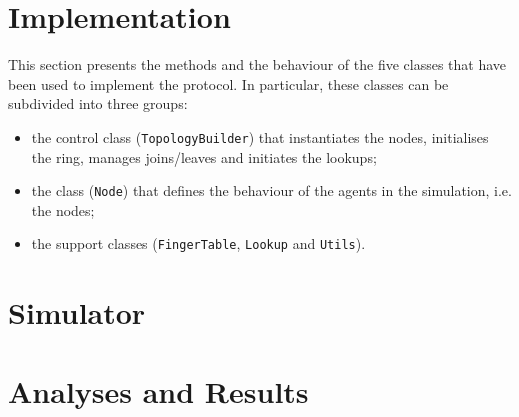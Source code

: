 \documentclass[11pt,twocolumn,letterpaper]{article}
\begin{document}
	\section{Implementation}
	\label{sec:implementation}
	This section presents the methods and the behaviour of the five classes that have been used to implement the protocol. In particular, these classes can be subdivided into three groups:
	\begin{itemize}
		\item the control class (\texttt{TopologyBuilder}) that instantiates the nodes, initialises the ring, manages joins/leaves and initiates the lookups;
		\item the class (\texttt{Node}) that defines the behaviour of the agents in the simulation, i.e. the nodes;
		\item the support classes (\texttt{FingerTable}, \texttt{Lookup} and \texttt{Utils}).
	\end{itemize}
	
	\section{Simulator}
	\label{sec:simulator}
	
	\section{Analyses and Results}
	\label{sec:analyses}
	
	\printbibliography
\end{document}
